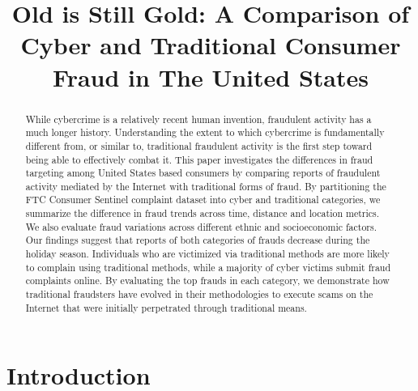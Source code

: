 \documentclass[conference]{IEEEtran}
\begin{document}
\title{Old is Still Gold: A Comparison of Cyber and Traditional Consumer Fraud in The United States}


\author{
}

\maketitle

\begin{abstract}

While cybercrime is a relatively recent human invention, fraudulent activity
has a much longer history. Understanding the extent to which cybercrime is
fundamentally different from, or similar to, traditional fraudulent activity is
the first step toward being able to effectively combat it. This paper
investigates the differences in fraud targeting among United States based
consumers by comparing reports of fraudulent activity mediated by the Internet
with traditional forms of fraud. By partitioning the FTC Consumer Sentinel
complaint dataset into cyber and traditional categories, we summarize the
difference in fraud trends across time, distance and location metrics. We also
evaluate fraud variations across different ethnic and socioeconomic factors.
Our findings suggest that reports of both categories of frauds decrease during
the holiday season. Individuals who are victimized via traditional methods are
more likely to complain using traditional methods, while a majority of cyber
victims submit fraud complaints online. By evaluating the top frauds in each
category, we demonstrate how traditional fraudsters have evolved in their
methodologies to execute scams on the Internet that were initially perpetrated
through traditional means.

\end{abstract}

\section{Introduction}
\end{document}
